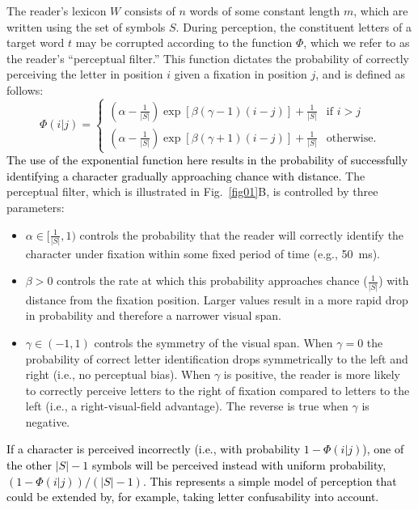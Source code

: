 \documentclass[doc,biblatex]{apa7}
\newcommand\newmaterial[1]{\textcolor{black}{#1}}
\begin{document}
The reader's lexicon $W$ consists of $n$ words of some constant length $m$, which are written using the set of symbols $S$. During perception, the constituent letters of a target word $t$ may be corrupted according to the function $\Phi$, which we refer to as the reader's ``perceptual filter.'' This function dictates the probability of correctly perceiving the letter in position $i$ given a fixation in position $j$, and is defined as follows:
\begin{equation}
\Phi(i|j) =
\begin{cases}
    (\alpha - \frac{1}{|S|}) \exp [ \beta (\gamma - 1) (i - j) ] + \frac{1}{|S|} & \text{if $i > j$} \\
    (\alpha - \frac{1}{|S|}) \exp [ \beta (\gamma + 1) (i - j) ] + \frac{1}{|S|} & \text{otherwise.}
\end{cases}
\label{eq_filter}
\end{equation}
\newmaterial{The use of the exponential function here results in the probability of successfully identifying a character gradually approaching chance with distance.} The perceptual filter, which is illustrated in Fig.~\ref{fig01}B, is controlled by three parameters:
\begin{itemize}
    \item $\alpha \in [\frac{1}{|S|}, 1)$ controls the probability that the reader will correctly identify the character under fixation within some fixed period of time (e.g., 50~ms).
    \item $\beta > 0$ controls the rate at which this probability approaches chance ($\frac{1}{|S|}$) with distance from the fixation position. Larger values result in a more rapid drop in probability and therefore a narrower visual span.
    \item $\gamma \in (-1, 1)$ controls the symmetry of the visual span. When $\gamma = 0$ the probability of correct letter identification drops symmetrically to the left and right (i.e., no perceptual bias). When $\gamma$ is positive, the reader is more likely to correctly perceive letters to the right of fixation compared to letters to the left (i.e., a right-visual-field advantage). The reverse is true when $\gamma$ is negative.
\end{itemize}
\newmaterial{If a character is perceived incorrectly (i.e., with probability $1 - \Phi(i|j)$), one of the other $|S|-1$ symbols will be perceived instead with uniform probability, $(1 - \Phi(i|j)) / (|S| - 1)$. This represents a simple model of perception that could be extended by, for example, taking letter confusability into account.}
\end{document}
